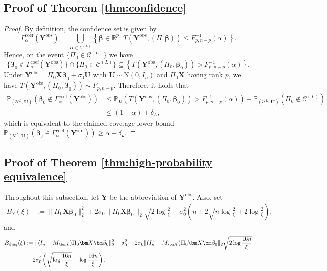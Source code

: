 \documentclass[11pt, reqno]{amsart}
\newcommand{\R}{\mathbb{R}}
\newcommand{\bP}{\mathbb{P}}
\renewcommand{\le}{\leqslant}
\renewcommand{\ge}{\geqslant}
\newcommand{\mC}{\mathcal{C}}
\newcommand{\1}{\mbox{1}\hspace{-0.25em}\mbox{l}}
\newcommand{\obs}{\mathrm{obs}}
\newcommand{\Normal}{\mathrm{N}}
\theoremstyle{definition}\newtheorem{problem}{Problem}[section]
\theoremstyle{definition}\newtheorem{definition}[problem]{Definition}
\theoremstyle{remark}\newtheorem{assumption}{Assumption}
\theoremstyle{remark}\newtheorem{remark}[problem]{Remark}
\theoremstyle{definition}\newtheorem{example}[problem]{Example}
\theoremstyle{plain}\newtheorem{theorem}[problem]{Theorem}
\theoremstyle{plain}\newtheorem{question}[problem]{Question}
\theoremstyle{plain}\newtheorem{lemma}[problem]{Lemma}
\theoremstyle{plain}\newtheorem{proposition}[problem]{Proposition}
\theoremstyle{plain}\newtheorem{corollary}[problem]{Corollary}
\theoremstyle{plain}\newtheorem{conjecture}[problem]{Conjecture}
\begin{document}
\subsection{Proof of Theorem \ref{thm:confidence}}
\begin{proof}
By definition, the confidence set is given by
\[
\Gamma_{\alpha}^{\mathrm{coef}}(\bm{Y}^{\obs})
= \bigcup_{\Pi\in \mC^{(L)}}\left\{\bm{\beta}\in \R^p:\ T(\bm{Y}^{\obs},(\Pi,\bm{\beta}))\le F_{p,n-p}^{-1}(\alpha)\right\}.
\]
Hence, on the event $\{\Pi_0\in \mC^{(L)}\}$ we have
\[
\{\bm{\beta}_0\notin \Gamma_{\alpha}^{\mathrm{coef}}(\bm{Y}^{\obs})\}\cap\{\Pi_0\in \mC^{(L)}\}
\subseteq
\left\{T(\bm{Y}^{\obs},(\Pi_0,\bm{\beta}_0))> F_{p,n-p}^{-1}(\alpha)\right\}.
\]
Under $\bm{Y}^{\obs}=\Pi_0\bm X\bm\beta_0+\sigma_0\bm U$ with $\bm U\sim \Normal(0,I_n)$ and $\Pi_0\bm X$ having rank $p$, we have
$T(\bm{Y}^{\obs},(\Pi_0,\bm{\beta}_0))\sim F_{p,n-p}$.
Therefore, it holds that
\begin{align*}
\bP_{\left(\mathcal{U}^L, \bm{U}\right)}\left(\bm{\beta}_0\notin \Gamma_{\alpha}^{\mathrm{coef}}(\bm{Y}^{\obs})\right)
&\le 
\bP_{\bm U}\left(T(\bm{Y}^{\obs},(\Pi_0,\bm{\beta}_0))> F_{p,n-p}^{-1}(\alpha)\right)
+
\bP_{\left(\mathcal{U}^L, \bm{U}\right)}\left(\Pi_0\notin \mC^{(L)}\right)\\
&\le (1-\alpha)+\delta_L,
\end{align*}
which is equivalent to the claimed coverage lower bound
$\bP_{\left(\mathcal{U}^L, \bm{U}\right)}\left(\bm{\beta}_0\in \Gamma_{\alpha}^{\mathrm{coef}}(\bm{Y}^{\obs})\right)\ge \alpha-\delta_L$.
\end{proof}


\subsection{Proof of Theorem \ref{thm:high-probability equivalence}}\label{subsec: proof of hungarian} Throughout this subsection, let $\bm{Y}$ be the abbreviation of $\bm{Y}^{\obs}$. Also, set
\begin{align*}
B_Y(\xi)&:= \|\Pi_0\bm X\bm\beta_0\|_2^2 + 2\sigma_0\|\Pi_0\bm X\bm\beta_0\|_2\sqrt{2\log\frac{2}{\xi}}
 + \sigma_0^2 \left(n+2\sqrt{n\log\frac{2}{\xi}}+2\log\frac{2}{\xi}\right),
\end{align*}
and
\begin{align}
    B_{\rm diag}(\xi)
&:= \|(I_n-M_{\bm X})\Pi_0\bm X\bm\beta_0\|_2^2+\sigma_0^2 
+2\sigma_0\|(I_n-M_{\bm X})\Pi_0\bm X\bm\beta_0\|_2\sqrt{2\log\frac{16n}{\xi}} \label{eq:bdiag}
\\ &+2\sigma_0^2 \left(\sqrt{\log\frac{16n}{\xi}}+\log\frac{16n}{\xi}\right). \nonumber
\end{align}
\end{document}
